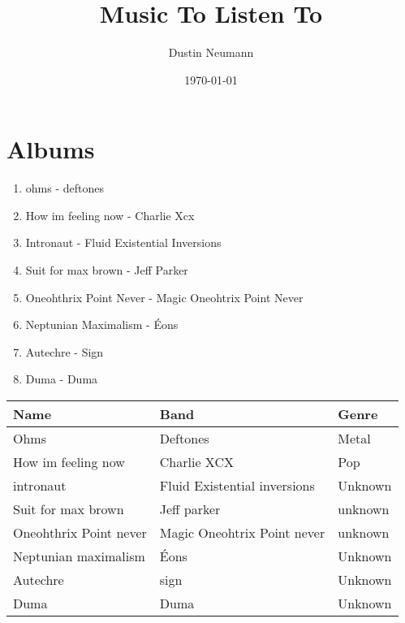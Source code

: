 \documentclass[11pt]{article}
\author{Dustin Neumann}
\date{\today}
\title{Music To Listen To}
\begin{document}
\maketitle
\tableofcontents


\section{Albums}
\label{sec:org80644a9}
\begin{enumerate}
\item ohms - deftones
\item How im feeling now - Charlie Xcx
\item Intronaut - Fluid Existential Inversions
\item Suit for max brown - Jeff Parker
\item Oneohthrix Point Never - Magic Oneohtrix Point Never
\item Neptunian Maximalism - Éons
\item Autechre - Sign
\item Duma - Duma
\end{enumerate}

\begin{center}
\begin{tabular}{lll}
Name & Band & Genre\\
\hline
Ohms & Deftones & Metal\\
How im feeling now & Charlie XCX & Pop\\
intronaut & Fluid Existential inversions & Unknown\\
Suit for max brown & Jeff parker & unknown\\
Oneohthrix Point never & Magic Oneohtrix Point never & unknown\\
Neptunian maximalism & Éons & Unknown\\
Autechre & sign & Unknown\\
Duma & Duma & Unknown\\
\end{tabular}
\end{center}
\end{document}
